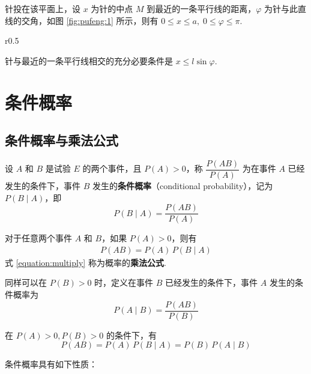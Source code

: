 \begin{solution}
    针投在该平面上，设 $x$ 为针的中点 $M$ 到最近的一条平行线的距离，$\varphi$ 为针与此直线的交角，如图 \ref{fig:pufeng:1} 所示，则有 $0 \leqslant x \leqslant a, \; 0 \leqslant \varphi \leqslant \pi$.

    \begin{wrapfigure}[8]{r}{0.5\textwidth}
        \centering

        
        \caption{}
        \label{fig:pufeng:1}
    \end{wrapfigure}

    针与最近的一条平行线相交的充分必要条件是 $x \leqslant l \sin \varphi$.
\end{solution}

\section{条件概率}

\subsection{条件概率与乘法公式}

\begin{definition}
    设 $A$ 和 $B$ 是试验 $E$ 的两个事件，且 $P(A)>0$，称 $\dfrac{P(AB)}{P(A)}$ 为在事件 $A$ 已经发生的条件下，事件 $B$ 发生的\textbf{条件概率}（conditional probability），记为 $P(B \mid A)$，即
    $$
    P(B \mid A)=\dfrac{P(AB)}{P(A)}
    $$
\end{definition}

对于任意两个事件 $A$ 和 $B$，如果 $P(A)>0$，则有
\begin{align} \label{equation:multiply}
    P(AB)=P(A) \, P(B \mid A)
\end{align}
式 \eqref{equation:multiply} 称为概率的\textbf{乘法公式}.

同样可以在 $P(B)>0$ 时，定义在事件 $B$ 已经发生的条件下，事件 $A$ 发生的条件概率为
$$
P(A \mid B)=\dfrac{P(AB)}{P(B)}
$$

在 $P(A)>0,P(B)>0$ 的条件下，有
$$
P(AB) = P(A) \, P(B \mid A) = P(B) \, P(A \mid B)
$$

条件概率具有如下性质：

